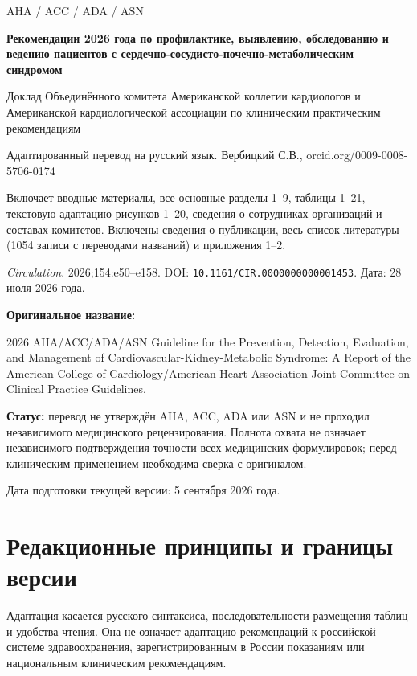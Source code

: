 \documentclass[11pt,a4paper]{article}
\begin{document}
\begin{titlepage}
\centering
{\large AHA / ACC / ADA / ASN\par}
\vspace{1cm}
{\LARGE\bfseries Рекомендации 2026 года по профилактике, выявлению, обследованию и ведению пациентов с сердечно-сосудисто-почечно-метаболическим синдромом\par}
\vspace{0.8cm}
{\large Доклад Объединённого комитета Американской коллегии кардиологов и Американской кардиологической ассоциации по клиническим практическим рекомендациям\par}
\vspace{1cm}
{\Large Адаптированный перевод на русский язык. Вербицкий С.В., orcid.org/0009-0008-5706-0174\par}
\vspace{0.4cm}
{\large\bfseries\par}
\vspace{0.4cm}
{\normalsize Включает вводные материалы, все основные разделы 1--9, таблицы 1--21, текстовую адаптацию рисунков 1--20, сведения о сотрудниках организаций и составах комитетов. Включены сведения о публикации, весь список литературы (1054 записи с переводами названий) и приложения 1--2.\par}
\vfill
\begin{flushleft}
\textbf{} \textit{Circulation}. 2026;154:e50--e158. DOI: \nolinkurl{10.1161/CIR.0000000000001453}. Дата: 28 июля 2026 года.

\textbf{Оригинальное название:}\par
{\small 2026 AHA/ACC/ADA/ASN Guideline for the Prevention, Detection, Evaluation, and Management of Cardiovascular-Kidney-Metabolic Syndrome: A Report of the American College of Cardiology/American Heart Association Joint Committee on Clinical Practice Guidelines.}

\textbf{Статус:} перевод не утверждён AHA, ACC, ADA или ASN и не проходил независимого медицинского рецензирования. Полнота охвата не означает независимого подтверждения точности всех медицинских формулировок; перед клиническим применением необходима сверка с оригиналом.
\end{flushleft}
\vspace{0.4cm}
{\small Дата подготовки текущей версии: 5 сентября 2026 года.}
\end{titlepage}

\section*{Редакционные принципы и границы версии}
Адаптация касается русского синтаксиса, последовательности размещения таблиц и удобства чтения. Она не означает адаптацию рекомендаций к российской системе здравоохранения, зарегистрированным в России показаниям или национальным клиническим рекомендациям.
\end{document}
